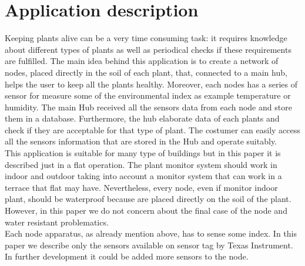 \documentclass[conference]{IEEEtran}
\begin{document}
\section{Application description}
Keeping plants alive can be a very time consuming task: it requires knowledge about different types of plants as well as periodical checks if these requirements are fulfilled. 
The main idea behind this application is to create a network of nodes, placed directly in the soil of each plant, that, connected to a main hub, helps the user to keep all the plants healthy. Moreover, each nodes has a series of sensor for measure some of the environmental index as example temperature or humidity. The main Hub received all the sensors data from each node and store them in a database. Furthermore, the hub elaborate data of each plants and check if they are acceptable for that type of plant. The costumer can easily access all the sensors information that are stored in the Hub and operate suitably.	\\
This application is suitable for many type of buildings but in this paper it is described just in a flat operation. The plant monitor system should work in indoor and outdoor taking into account a monitor system that can work in a terrace that flat may have. Nevertheless, every node, even if monitor indoor plant, should be waterproof because are placed directly on the soil of the plant. However, in this paper we do not concern about the final case of the node and water resistant problematics.\\
Each node apparatus, as already mention above, has to sense some index. In this paper we describe only the sensors available on sensor tag by Texas Instrument. In further development it could be added more sensors to the node.
 \\
 
\end{document}
